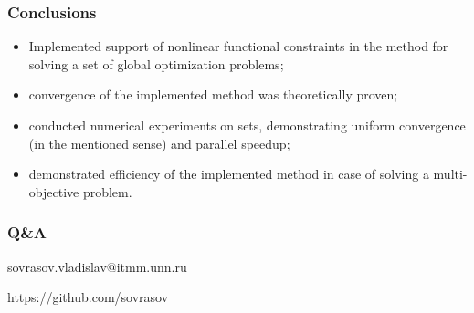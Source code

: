 \documentclass[aspectratio=1610]{beamer}
\newcommand\unnumbered{\setbeamertemplate{footline}{}}
\begin{document}
\begin{frame}
  \frametitle{Conclusions}
    \begin{itemize}
      \item Implemented support of nonlinear functional constraints in the method
      for solving a set of global optimization problems;
      \item convergence of the implemented method was theoretically proven;
      \item conducted numerical experiments on sets, demonstrating uniform convergence (in the mentioned sense) and
      parallel speedup;
      \item demonstrated efficiency of the implemented method in case of solving a multi-objective problem.
    \end{itemize}
\end{frame}

{
\unnumbered
\begin{frame}{{}}
  \frametitle{Q\&A}
  \begin{center}
\vspace{0.5cm}

    sovrasov.vladislav@itmm.unn.ru

    https://github.com/sovrasov
  \end{center}
\end{frame}
}
\end{document}
